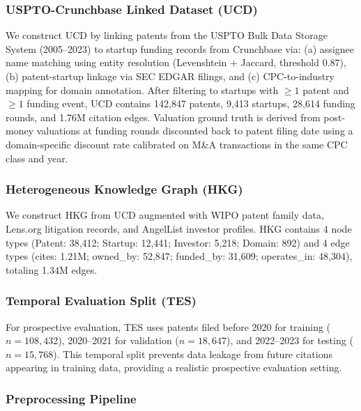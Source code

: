 \documentclass[journal]{IEEEtran}
\begin{document}
\subsubsection{USPTO-Crunchbase Linked Dataset (UCD)}
We construct UCD by linking patents from the USPTO Bulk Data Storage System (2005--2023) to startup funding records from Crunchbase via: (a) assignee name matching using entity resolution (Levenshtein + Jaccard, threshold 0.87), (b) patent-startup linkage via SEC EDGAR filings, and (c) CPC-to-industry mapping for domain annotation. After filtering to startups with $\geq 1$ patent and $\geq 1$ funding event, UCD contains 142,847 patents, 9,413 startups, 28,614 funding rounds, and 1.76M citation edges. Valuation ground truth is derived from post-money valuations at funding rounds discounted back to patent filing date using a domain-specific discount rate calibrated on M\&A transactions in the same CPC class and year.

\subsubsection{Heterogeneous Knowledge Graph (HKG)}
We construct HKG from UCD augmented with WIPO patent family data, Lens.org litigation records, and AngelList investor profiles. HKG contains 4 node types (Patent: 38,412; Startup: 12,441; Investor: 5,218; Domain: 892) and 4 edge types (cites: 1.21M; owned\_by: 52,847; funded\_by: 31,609; operates\_in: 48,304), totaling 1.34M edges.

\subsubsection{Temporal Evaluation Split (TES)}
For prospective evaluation, TES uses patents filed before 2020 for training ($n=108{,}432$), 2020--2021 for validation ($n=18{,}647$), and 2022--2023 for testing ($n=15{,}768$). This temporal split prevents data leakage from future citations appearing in training data, providing a realistic prospective evaluation setting.

\subsubsection{Preprocessing Pipeline}
\end{document}
